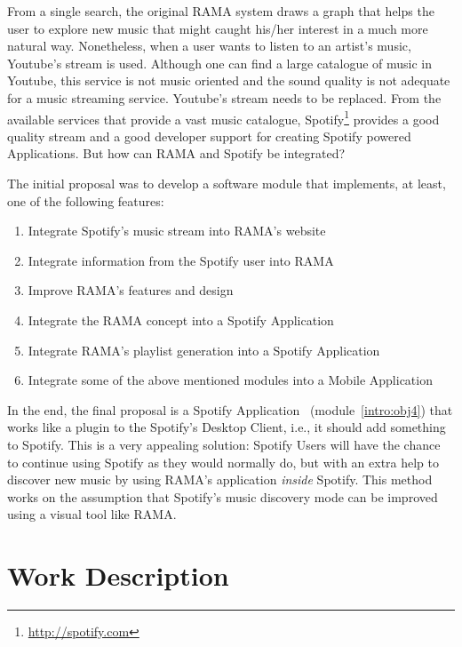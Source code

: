 \documentclass[twocolumn]{article}
\begin{document}
  From a single search, the original RAMA system draws a graph that helps the user to explore new music that might caught his/her interest in a much more natural way.
  Nonetheless, when a user wants to listen to an artist's music, Youtube's stream is used.
  Although one can find a large catalogue of music in Youtube, this service is not music oriented and the sound quality is not adequate for a music streaming service.
  Youtube's stream needs to be replaced.
  From the available services that provide a vast music catalogue, Spotify\footnote{\url{http://spotify.com}} provides a good quality stream and a good developer support for creating Spotify powered Applications.
  But how can RAMA and Spotify be integrated?
  
  The initial proposal was to develop a software module that implements, at least, one of the following features:

  \begin{enumerate}
    \item \label{intro:obj1} Integrate Spotify's music stream into RAMA's website
    \item \label{intro:obj2} Integrate information from the Spotify user into RAMA
    \item \label{intro:obj3} Improve RAMA's features and design
    \item \label{intro:obj4} Integrate the RAMA concept into a Spotify Application
    \item \label{intro:obj5} Integrate RAMA's playlist generation into a Spotify Application
    \item \label{intro:obj6} Integrate some of the above mentioned modules into a Mobile Application
  \end{enumerate}

  In the end, the final proposal is a Spotify Application~\cite{spotifyapps} (module~\ref{intro:obj4}) that works like a plugin to the Spotify's Desktop Client, i.e., it should add something to Spotify.
  This is a very appealing solution: Spotify Users will have the chance to continue using Spotify as they would normally do, but with an extra help to discover new music by using RAMA's application \emph{inside} Spotify. 
  This method works on the assumption that Spotify's music discovery mode can be improved using a visual tool like RAMA.

\section{Work Description}
\label{sec:work}
  
\end{document}
